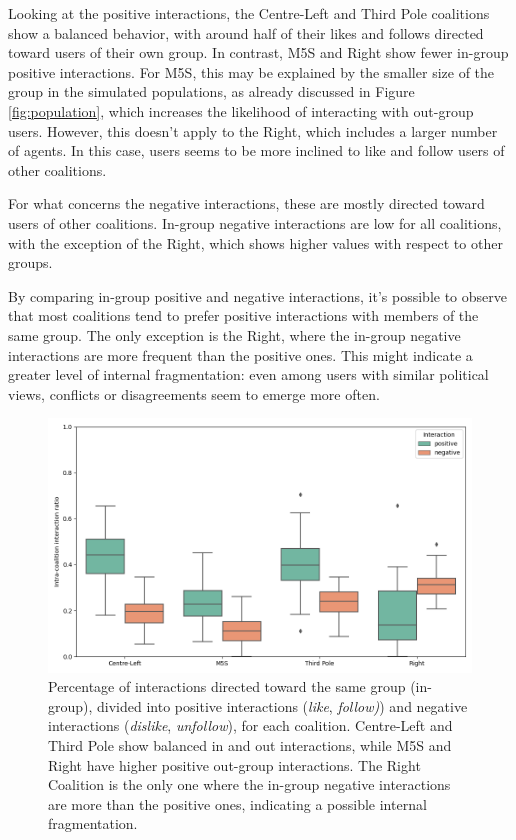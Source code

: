 Looking at the positive interactions, the Centre-Left and Third Pole coalitions show a balanced behavior, with around half of their likes and follows directed toward users of their own group.
In contrast, M5S and Right show fewer in-group positive interactions.
For M5S, this may be explained by the smaller size of the group in the simulated populations, as already discussed in Figure \ref{fig:population}, which increases the likelihood of interacting with out-group users.
However, this doesn't apply to the Right, which includes a larger number of agents. In this case, users seems to be more inclined to like and follow users of other coalitions.

For what concerns the negative interactions, these are mostly directed toward users of other coalitions.
In-group negative interactions are low for all coalitions, with the exception of the Right, which shows higher values with respect to other groups.

By comparing in-group positive and negative interactions, it's possible to observe that most coalitions tend to prefer positive interactions with members of the same group.
The only exception is the Right, where the in-group negative interactions are more frequent than the positive ones.
This might indicate a greater level of internal fragmentation: even among users with similar political views, conflicts or disagreements seem to emerge more often.


\begin{figure}[h]
    \centering
    \includegraphics[width=0.6\linewidth]{Images/Interactions/pos_neg_in_DefaultRecSys.png}
    \caption{Percentage of interactions directed toward the same group (in-group), divided into positive interactions (\textit{like}, \textit{follow)}) and negative interactions (\textit{dislike}, \textit{unfollow}), for each coalition.
    Centre-Left and Third Pole show balanced in and out interactions, while M5S and Right have higher positive out-group interactions.
    The Right Coalition is the only one where the in-group negative interactions are more than the positive ones, indicating a possible internal fragmentation.}
    \label{fig:interactions_inout}
\end{figure}


